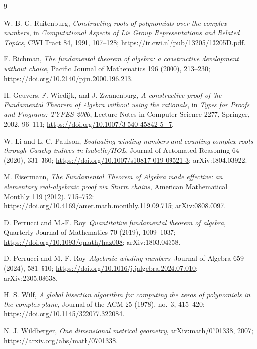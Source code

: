 \documentclass[11pt]{article}
\begin{document}
\small
\begin{thebibliography}{9}
\raggedright
{}
W. B. G. Ruitenburg,
\emph{Constructing roots of polynomials over the complex numbers},
in \emph{Computational Aspects of Lie Group Representations and Related
Topics}, CWI Tract 84, 1991, 107--128;
\url{https://ir.cwi.nl/pub/13205/13205D.pdf}.

F. Richman,
\emph{The fundamental theorem of algebra: a constructive development without
choice},
Pacific Journal of Mathematics 196 (2000), 213--230;
\url{https://doi.org/10.2140/pjm.2000.196.213}.

H. Geuvers, F. Wiedijk, and J. Zwanenburg,
\emph{A constructive proof of the Fundamental Theorem of Algebra without
using the rationals},
in \emph{Types for Proofs and Programs: TYPES 2000}, Lecture Notes in
Computer Science 2277, Springer, 2002, 96--111;
\url{https://doi.org/10.1007/3-540-45842-5_7}.

W. Li and L. C. Paulson,
\emph{Evaluating winding numbers and counting complex roots through Cauchy indices in Isabelle\slash HOL},
Journal of Automated Reasoning 64 (2020), 331--360;
\url{https://doi.org/10.1007/s10817-019-09521-3}; arXiv:1804.03922.

M. Eisermann,
\emph{The Fundamental Theorem of Algebra made effective: an elementary real-algebraic proof via Sturm chains},
American Mathematical Monthly 119 (2012), 715--752;
\url{https://doi.org/10.4169/amer.math.monthly.119.09.715};
arXiv:0808.0097.

D. Perrucci and M.-F. Roy,
\emph{Quantitative fundamental theorem of algebra},
Quarterly Journal of Mathematics 70 (2019), 1009--1037;
\url{https://doi.org/10.1093/qmath/haz008}; arXiv:1803.04358.

D. Perrucci and M.-F. Roy,
\emph{Algebraic winding numbers},
Journal of Algebra 659 (2024), 581--610;
\url{https://doi.org/10.1016/j.jalgebra.2024.07.010}; arXiv:2305.08638.

H. S. Wilf,
\emph{A global bisection algorithm for computing the zeros of polynomials in
the complex plane},
Journal of the ACM 25 (1978), no.~3, 415--420;
\url{https://doi.org/10.1145/322077.322084}.

N. J. Wildberger,
\emph{One dimensional metrical geometry},
arXiv:math/0701338, 2007;
\url{https://arxiv.org/abs/math/0701338}.
\end{thebibliography}
\end{document}
